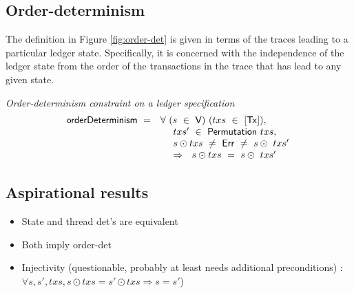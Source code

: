 \subsection{Order-determinism}
\label{sec:order-det}

The definition in Figure \ref{fig:order-det} is given in terms of the traces leading
to a particular ledger state. Specifically, it is concerned with the independence of the
ledger state from the order
of the transactions in the trace that has lead to any given state.

\begin{figure*}[htb]
  \emph{Order-determinism constraint on a ledger specification}
  \begin{equation*}
    \begin{array}{l@{~~}l@{~~}ll}
    \fun{orderDeterminism} ~=~ & \forall~(s~\in~\V)~(txs~\in~[\Tx]),~\\
    & ~~~~txs'~\in~\fun{Permutation}~txs,~\\
    & ~~~~s\odot txs~\neq~\Err~\neq~s \odot~txs' \\
    & ~~~~\Rightarrow~~s\odot txs~=~s \odot~txs'
    \end{array}
  \end{equation*}
  \caption{Order-determinism}
  \label{fig:order-det}
\end{figure*}


\subsection{Aspirational results}

\begin{itemize}
  \item[(i)] State and thread det's are equivalent
  \item[(ii)] Both imply order-det
  \item[(iii)] Injectivity (questionable, probably at least needs additional preconditions) : \\
  $\forall s, s', txs, s \odot txs = s' \odot txs \Rightarrow s = s'$)
\end{itemize}

%
%
%
